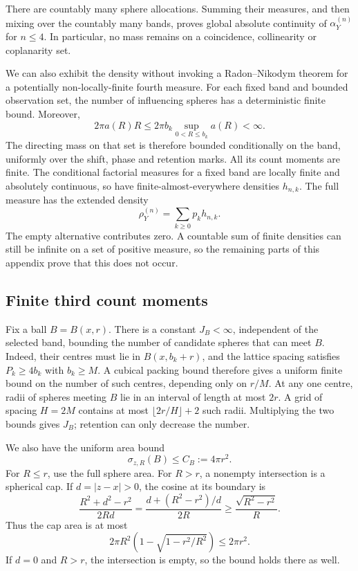 \documentclass[11pt,a4paper]{article}
\numberwithin{equation}{section}
\theoremstyle{definition}
\theoremstyle{remark}
\begin{document}
There are countably many sphere allocations. Summing their measures, and
then mixing over the countably many bands, proves global absolute
continuity of $\alpha_Y^{(n)}$ for $n\leq4$. In particular, no mass remains
on a coincidence, collinearity or coplanarity set.

We can also exhibit the density without invoking a Radon--Nikodym theorem
for a potentially non-locally-finite fourth measure. For each fixed band
and bounded observation set, the number of influencing spheres has a
deterministic finite bound. Moreover,
\[
 2\pi a(R)R\leq2\pi b_k\sup_{0<R\leq b_k}a(R)<\infty.
\]
The directing mass on that set is therefore bounded conditionally on the
band, uniformly over the shift, phase and retention marks. All its count
moments are finite. The conditional factorial measures for a fixed band
are locally finite and absolutely continuous, so have finite-almost-everywhere
densities $h_{n,k}$. The full measure has the extended density
\begin{equation}
 \rho_Y^{(n)}=\sum_{k\geq0}p_kh_{n,k}.
 \label{eq:band-density-sum}
\end{equation}
The empty alternative contributes zero. A countable sum of finite densities
can still be infinite on a set of positive measure, so the remaining
parts of this appendix prove that this does not occur.

\subsection{Finite third count moments}
\label{app:third-moment}

Fix a ball $B=B(x,r)$. There is a constant $J_B<\infty$, independent of the
selected band, bounding the number of candidate spheres that can meet
$B$. Indeed, their centres must lie in $B(x,b_k+r)$, and the lattice
spacing satisfies $P_k\geq4b_k$ with $b_k\geq M$. A cubical packing bound
therefore gives a uniform finite bound on the number of such centres,
depending only on $r/M$. At any one centre, radii of spheres meeting $B$
lie in an interval of length at most $2r$. A grid of spacing $H=2M$
contains at most $\lfloor2r/H\rfloor+2$ such radii. Multiplying the two
bounds gives $J_B$; retention can only decrease the number.

We also have the uniform area bound
\begin{equation}
 \sigma_{z,R}(B)\leq C_B:=4\pi r^2.
 \label{eq:cap-bound}
\end{equation}
For $R\leq r$, use the full sphere area. For $R>r$, a nonempty
intersection is a spherical cap. If $d=|z-x|>0$, the cosine at its boundary
is
\[
 \frac{R^2+d^2-r^2}{2Rd}
 =\frac{d+(R^2-r^2)/d}{2R}
 \geq\frac{\sqrt{R^2-r^2}}{R}.
\]
Thus the cap area is at most
\[
 2\pi R^2\left(1-\sqrt{1-r^2/R^2}\right)\leq2\pi r^2.
\]
If $d=0$ and $R>r$, the intersection is empty, so the bound holds there
as well.
\end{document}
